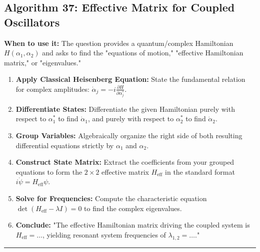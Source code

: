\documentclass[11pt, a4paper]{report}
\begin{document}
\subsection*{Algorithm 37: Effective Matrix for Coupled Oscillators}
\textbf{When to use it:} The question provides a quantum/complex Hamiltonian $H(\alpha_1, \alpha_2)$ and asks to find the "equations of motion," "effective Hamiltonian matrix," or "eigenvalues."
\begin{enumerate}[label=\textbf{\arabic*.}]
    \item \textbf{Apply Classical Heisenberg Equation:} State the fundamental relation for complex amplitudes: $\dot{\alpha}_j = -i \frac{\partial H}{\partial \alpha_j^*}$.
    \item \textbf{Differentiate States:} Differentiate the given Hamiltonian purely with respect to $\alpha_1^*$ to find $\dot{\alpha}_1$, and purely with respect to $\alpha_2^*$ to find $\dot{\alpha}_2$.
    \item \textbf{Group Variables:} Algebraically organize the right side of both resulting differential equations strictly by $\alpha_1$ and $\alpha_2$.
    \item \textbf{Construct State Matrix:} Extract the coefficients from your grouped equations to form the $2 \times 2$ effective matrix $H_{\text{eff}}$ in the standard format $i\dot{\psi} = H_{\text{eff}} \psi$.
    \item \textbf{Solve for Frequencies:} Compute the characteristic equation $\det(H_{\text{eff}} - \lambda I) = 0$ to find the complex eigenvalues.
    \item \textbf{Conclude:} "The effective Hamiltonian matrix driving the coupled system is $H_{\text{eff}} = \dots$, yielding resonant system frequencies of $\lambda_{1,2} = \dots$."
\end{enumerate}
\vspace{1em}
\noindent\rule{\textwidth}{0.4pt}
\vspace{1em}
\end{document}
